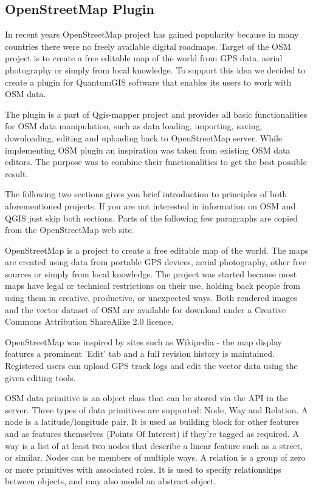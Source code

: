 
\subsection{OpenStreetMap Plugin}


In recent years OpenStreetMap project has gained popularity because in many
countries there were no freely available digital roadmaps. Target of the OSM
project is to create a free editable map of the world from GPS data, aerial
photography or simply from local knowledge. To support this idea we decided
to create a plugin for QuantumGIS software that enables its users to work
with OSM data.

The plugin is a part of Qgis-mapper project and provides all basic
functionalities for OSM data manipulation, such as data loading, importing,
saving, downloading, editing and uploading back to OpenStreetMap server.
While implementing OSM plugin an inspiration was taken from existing OSM data
editors. The purpose was to combine their functionalities to get the best
possible result.

The following two sections gives you brief introduction to principles of both
aforementioned projects. If you are not interested in information on OSM and
QGIS just skip both sections. Parts of the following few paragraphs are
copied from the OpenStreetMap web site.


OpenStreetMap is a project to create a free editable map of the world. The
maps are created using data from portable GPS devices, aerial photography,
other free sources or simply from local knowledge. The project was started
because most maps have legal or technical restrictions on their use, holding
back people from using them in creative, productive, or unexpected ways. Both
rendered images and the vector dataset of OSM are available for download
under a Creative Commons Attribution ShareAlike 2.0 licence.

OpenStreetMap was inspired by sites such as Wikipedia - the map display
features a prominent 'Edit' tab and a full revision history is maintained.
Registered users can upload GPS track logs and edit the vector data using the
given editing tools.

OSM data primitive is an object class that can be stored via the API in the
server. Three types of data primitives are supported: Node, Way and Relation.
A node is a latitude/longitude pair. It is used as building block for other
features and as features themselves (Points Of Interest) if they're tagged as
required. A way is a list of at least two nodes that describe a linear
feature such as a street, or similar. Nodes can be members of multiple ways.
A relation is a group of zero or more primitives with associated roles. It is
used to specify relationships between objects, and may also model an abstract
object. 

